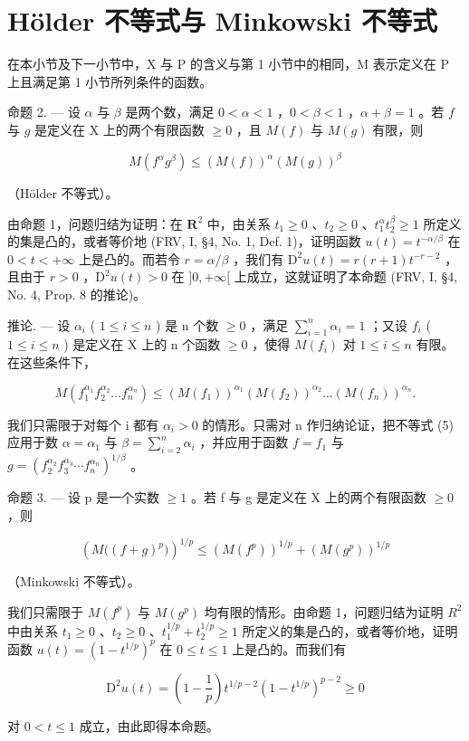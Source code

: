 \section{Hölder 不等式与 Minkowski 不等式}

在本小节及下一小节中，X 与 P 的含义与第 1 小节中的相同，M 表示定义在 P 上且满足第 1 小节所列条件的函数。

命题 2. --- 设 \(\alpha\) 与 \(\beta\) 是两个数，满足 \(0 < \alpha < 1\) ，\(0 < \beta < 1\) ，\(\alpha + \beta = 1\) 。若 \(f\) 与 \(g\) 是定义在 X 上的两个有限函数 \(\geqslant 0\) ，且 \(M(f)\) 与 \(M(g)\) 有限，则

\[
M (f ^ {\alpha} g ^ {\beta}) \leqslant (M (f)) ^ {\alpha} (M (g)) ^ {\beta}\tag{5}
\]

（Hölder 不等式）。

由命题 1，问题归结为证明：在 \(\mathbf{R}^2\) 中，由关系 \(t_1 \geqslant 0\) 、\(t_2 \geqslant 0\) 、\(t_1^\alpha t_2^\beta \geqslant 1\) 所定义的集是凸的，或者等价地 (FRV, I, §4, No. 1, Def. 1)，证明函数 \(u(t) = t^{-\alpha/\beta}\) 在 \(0 < t < +\infty\) 上是凸的。而若令 \(r = \alpha/\beta\) ，我们有 \(\mathrm{D}^2 u(t) = r(r + 1)t^{-r - 2}\) ，且由于 \(r > 0\) ，\(\mathrm{D}^2 u(t) > 0\) 在 \(]0, +\infty[\) 上成立，这就证明了本命题 (FRV, I, §4, No. 4, Prop. 8 的推论)。

推论. --- 设 \(\alpha_{i}\) ( \(1 \leqslant i \leqslant n\) ) 是 n 个数 \(\geqslant 0\) ，满足 \(\sum_{i=1}^{n} \alpha_{i} = 1\) ；又设 \(f_{i}\) ( \(1 \leqslant i \leqslant n\) ) 是定义在 X 上的 n 个函数 \(\geqslant 0\) ，使得 \(M(f_{i})\) 对 \(1 \leqslant i \leqslant n\) 有限。在这些条件下，

\[
M \left(f _ {1} ^ {\alpha_ {1}} f _ {2} ^ {\alpha_ {2}} \dots f _ {n} ^ {\alpha_ {n}}\right) \leqslant \left(M (f _ {1})\right) ^ {\alpha_ {1}} \left(M (f _ {2})\right) ^ {\alpha_ {2}} \dots \left(M (f _ {n})\right) ^ {\alpha_ {n}}.\tag{6}
\]

我们只需限于对每个 i 都有 \(\alpha_{i} > 0\) 的情形。只需对 n 作归纳论证，把不等式 (5) 应用于数 \(\alpha = \alpha_{1}\) 与 \(\beta = \sum_{i=2}^{n} \alpha_{i}\) ，并应用于函数 \(f = f_{1}\) 与 \(g = (f_{2}^{\alpha_{2}} f_{3}^{\alpha_{3}} \cdots f_{n}^{\alpha_{n}})^{1/\beta}\) 。

命题 3. --- 设 p 是一个实数 \(\geqslant 1\) 。若 f 与 g 是定义在 X 上的两个有限函数 \(\geqslant 0\) ，则

\[
\left(M \big ((f + g) ^ {p} \big)\right) ^ {1 / p} \leqslant \left(M (f ^ {p})\right) ^ {1 / p} + \left(M (g ^ {p})\right) ^ {1 / p}\tag{7}
\]

（Minkowski 不等式）。

我们只需限于 \(M(f^{p})\) 与 \(M(g^{p})\) 均有限的情形。由命题 1，问题归结为证明 \(R^{2}\) 中由关系 \(t_{1} \geqslant 0\) 、\(t_{2} \geqslant 0\) 、\(t_{1}^{1/p} + t_{2}^{1/p} \geqslant 1\) 所定义的集是凸的，或者等价地，证明函数 \(u(t) = (1 - t^{1/p})^{p}\) 在 \(0 \leqslant t \leqslant 1\) 上是凸的。而我们有

\[
\mathrm{D} ^ {2} u (t) = \left(1 - \frac {1}{p}\right) t ^ {1 / p - 2} (1 - t ^ {1 / p}) ^ {p - 2} \geqslant 0
\]

对 \(0 < t \leqslant 1\) 成立，由此即得本命题。

